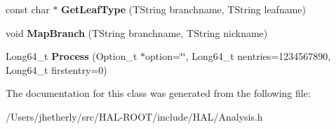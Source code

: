 \begin{DoxyCompactItemize}
\item 
\hypertarget{class_h_a_l_1_1_analysis_a8410426a53f7828270531f1ec56340b8}{const char $\ast$ {\bfseries Get\+Leaf\+Type} (T\+String branchname, T\+String leafname)}\label{class_h_a_l_1_1_analysis_a8410426a53f7828270531f1ec56340b8}

\item 
\hypertarget{class_h_a_l_1_1_analysis_a6e11fa65e712377587ed4b6a1a62c8aa}{void {\bfseries Map\+Branch} (T\+String branchname, T\+String nickname)}\label{class_h_a_l_1_1_analysis_a6e11fa65e712377587ed4b6a1a62c8aa}

\item 
\hypertarget{class_h_a_l_1_1_analysis_a4278a2e961076913371dec71da389701}{Long64\+\_\+t {\bfseries Process} (Option\+\_\+t $\ast$option=\char`\"{}\char`\"{}, Long64\+\_\+t nentries=1234567890, Long64\+\_\+t firstentry=0)}\label{class_h_a_l_1_1_analysis_a4278a2e961076913371dec71da389701}

\end{DoxyCompactItemize}


The documentation for this class was generated from the following file\+:\begin{DoxyCompactItemize}
\item 
/\+Users/jhetherly/src/\+H\+A\+L-\/\+R\+O\+O\+T/include/\+H\+A\+L/Analysis.\+h\end{DoxyCompactItemize}
